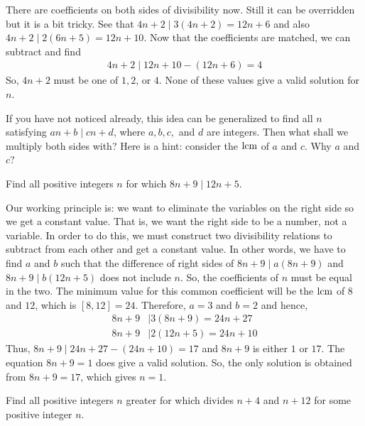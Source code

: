 \documentclass{subfile}
\begin{document}
		\begin{solution}
			There are coefficients on both sides of divisibility now. Still it can be overridden but it is a bit tricky. See that $4n+2\mid 3(4n+2)=12n+6$ and also $4n+2 \mid 2(6n+5)=12n+10$. Now that the coefficients are matched, we can subtract and find
				\begin{align*}
					4n+2\mid 12n+10-(12n+6)=4
				\end{align*}
			So, $4n+2$ must be one of $1,2$, or $4$. None of these values give a valid solution for $n$.
		\end{solution}
	If you have not noticed already, this idea can be generalized to find all $n$ satisfying $an+b\mid cn+d$, where $a,b,c,$ and $d$ are integers. Then what shall we multiply both sides with? Here is a hint: consider the $\operatorname{lcm}$ of $a$ and $c$. Why $a$ and $c$?
		\begin{problem}\label{prob:ex1}
			Find all positive integers $n$ for which $8n+9\mid 12n+5$.
		\end{problem}

		\begin{solution}
			Our working principle is: we want to eliminate the variables on the right side so we get a constant value. That is, we want the right side to be a number, not a variable. In order to do this, we must construct two divisibility relations to subtract from each other and get a constant value. In other words, we have to find $a$ and $b$ such that the difference of right sides of $8n+9 \mid a(8n+9)$ and $8n+9 \mid b(12n+5)$ does not include $n$. So, the coefficients of $n$ must be equal in the two. The minimum value for this common coefficient will be the $\operatorname{lcm}$ of $8$ and $12$, which is $[8,12]=24$. Therefore, $a=3$ and $b=2$ and hence,
				\begin{align*}
					8n+9 & \mid 3(8n+9) =24n+27\\
					8n+9 & \mid 2(12n+5) =24n+10
				\end{align*}
			Thus, $8n+9\mid 24n+27-(24n+10)=17$ and $8n+9$ is either $1$ or $17$. The equation $8n+9=1$ does give a valid solution. So, the only solution is obtained from $8n+9=17$, which gives $n=1$.
		\end{solution}

		\begin{problem}
			Find all positive integers $n$ greater for which divides $n+4$ and $n+12$ for some positive integer $n$.
		\end{problem}
\end{document}
